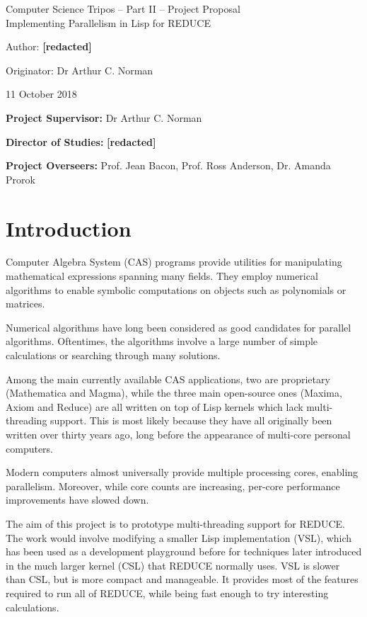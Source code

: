 \documentclass[12pt,a4paper,twoside]{article}
\begin{document}
\begin{center}
\Large
Computer Science Tripos -- Part II -- Project Proposal\\[4mm]
\LARGE
Implementing Parallelism in Lisp for REDUCE

\large
Author: \textbf{[redacted]}

Originator: Dr Arthur C. Norman

11 October 2018
\end{center}

\vspace{5mm}

\textbf{Project Supervisor:} Dr Arthur C. Norman

\textbf{Director of Studies:} \textbf{[redacted]}

\textbf{Project Overseers:} Prof. Jean Bacon, Prof. Ross Anderson, Dr. Amanda Prorok


\section*{Introduction}

Computer Algebra System (CAS) programs provide utilities for manipulating mathematical expressions
spanning many fields. They employ  numerical algorithms to enable symbolic computations
on objects such as polynomials or matrices.

Numerical algorithms have long been considered as good candidates for parallel algorithms.
Oftentimes, the algorithms involve a large number of simple calculations or searching through
many solutions.

Among the main currently available CAS applications, two are proprietary (Mathematica and Magma),
while the three main open-source ones (Maxima, Axiom and Reduce) are all written on top of Lisp
kernels which lack multi-threading support. This is most likely because they have all originally been
written over thirty years ago, long before the appearance of multi-core personal computers.

Modern computers almost universally provide multiple processing cores, enabling parallelism.
Moreover, while core counts are increasing, per-core performance improvements have slowed down.

The aim of this project is to prototype multi-threading support for REDUCE. The work would involve
modifying a smaller Lisp implementation (VSL), which has been used as a development playground
before for techniques later introduced in the much larger kernel (CSL) that REDUCE normally uses.
VSL is slower than CSL, but is more compact and manageable. It provides
most of the features required to run all of REDUCE, while being fast enough to try
interesting calculations.
\end{document}
